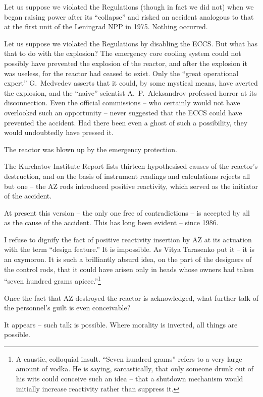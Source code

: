 \documentclass[openright]{bookest}
\begin{document}
Let us suppose we violated the Regulations (though in fact we did not) when we began raising power after its ``collapse'' and risked an accident analogous to that at the first unit of the Leningrad NPP in 1975. Nothing occurred.

Let us suppose we violated the Regulations by disabling the ECCS. But what has that to do with the explosion? The emergency core cooling system could not possibly have prevented the explosion of the reactor, and after the explosion it was useless, for the reactor had ceased to exist. Only the ``great operational expert'' G.~Medvedev asserts that it could, by some mystical means, have averted the explosion, and the ``naive'' scientist A.~P.~Aleksandrov professed horror at its disconnection. Even the official commissions -- who certainly would not have overlooked such an opportunity -- never suggested that the ECCS could have prevented the accident. Had there been even a ghost of such a possibility, they would undoubtedly have pressed it.

The reactor was blown up by the emergency protection.

The Kurchatov Institute Report lists thirteen hypothesised causes of the reactor's destruction, and on the basis of instrument readings and calculations rejects all but one -- the AZ rods introduced positive reactivity, which served as the initiator of the accident.

At present this version -- the only one free of contradictions -- is accepted by all as the cause of the accident. This has long been evident -- since 1986.

I refuse to dignify the fact of positive reactivity insertion by AZ at its actuation with the term ``design feature.'' It is impossible. As Vitya Tarasenko put it -- it is an oxymoron. It is such a brilliantly absurd idea, on the part of the designers of the control rods, that it could have arisen only in heads whose owners had taken ``seven hundred grams apiece.''\footnote{A caustic, colloquial insult. ``Seven hundred grams'' refers to a very large amount of vodka. He is saying, sarcastically, that only someone drunk out of his wits could conceive such an idea -- that a shutdown mechanism would initially increase reactivity rather than suppress it.}

Once the fact that AZ destroyed the reactor is acknowledged, what further talk of the personnel's guilt is even conceivable?

It appears -- such talk is possible. Where morality is inverted, all things are possible.
\end{document}
